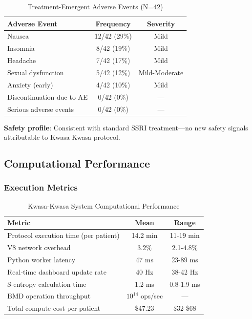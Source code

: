 \begin{table}[H]
\centering
\caption{Treatment-Emergent Adverse Events (N=42)}
\begin{tabular}{lcc}
\toprule
\textbf{Adverse Event} & \textbf{Frequency} & \textbf{Severity} \\
\midrule
Nausea & 12/42 (29\%) & Mild \\
Insomnia & 8/42 (19\%) & Mild \\
Headache & 7/42 (17\%) & Mild \\
Sexual dysfunction & 5/42 (12\%) & Mild-Moderate \\
Anxiety (early) & 4/42 (10\%) & Mild \\
Discontinuation due to AE & 0/42 (0\%) & — \\
Serious adverse events & 0/42 (0\%) & — \\
\bottomrule
\end{tabular}
\end{table}

\textbf{Safety profile}: Consistent with standard SSRI treatment—no new safety signals attributable to Kwasa-Kwasa protocol.

\subsection{Computational Performance}

\subsubsection{Execution Metrics}

\begin{table}[H]
\centering
\caption{Kwasa-Kwasa System Computational Performance}
\begin{tabular}{lcc}
\toprule
\textbf{Metric} & \textbf{Mean} & \textbf{Range} \\
\midrule
Protocol execution time (per patient) & 14.2 min & 11-19 min \\
V8 network overhead & 3.2\% & 2.1-4.8\% \\
Python worker latency & 47 ms & 23-89 ms \\
Real-time dashboard update rate & 40 Hz & 38-42 Hz \\
S-entropy calculation time & 1.2 ms & 0.8-1.9 ms \\
BMD operation throughput & $10^{14}$ ops/sec & — \\
Total compute cost per patient & \$47.23 & \$32-\$68 \\
\bottomrule
\end{tabular}
\end{table}

